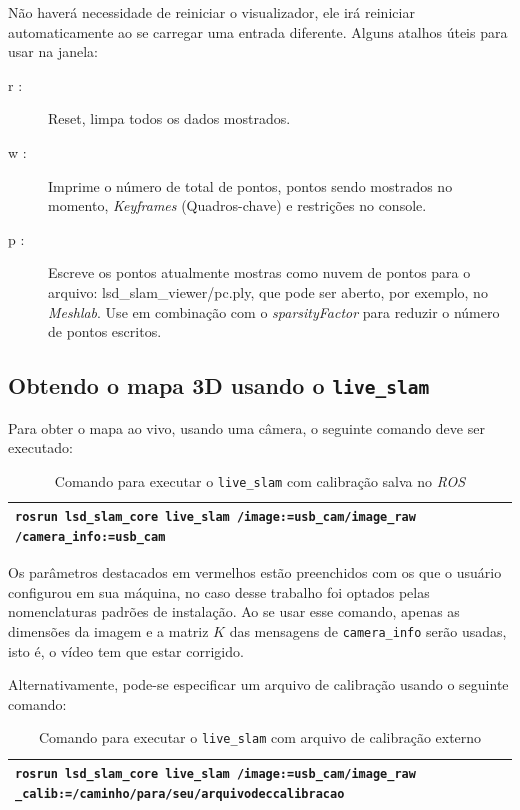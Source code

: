 Não haverá necessidade de reiniciar o visualizador, ele irá reiniciar automaticamente ao se carregar uma entrada diferente. Alguns atalhos úteis para usar na janela:

\begin{description}
	\item[r :]{Reset, limpa todos os dados mostrados.}
	\item[w :]{Imprime o número de total de pontos, pontos sendo mostrados no momento, \textit{Keyframes} (Quadros-chave) e restrições no console.}
	\item[p :]{Escreve os pontos atualmente mostras como nuvem de pontos para o arquivo: lsd\_slam\_viewer/pc.ply, que pode ser aberto, por exemplo, no \textit{Meshlab}. Use  em combinação com o \textit{sparsityFactor}  para reduzir o número de pontos escritos.}
\end{description}	

\subsection{Obtendo o mapa 3D usando o \texttt{live\_slam}}

Para obter o mapa ao vivo, usando uma câmera, o seguinte comando deve ser executado:

\begin{table}[!ht]\label{tb:14}
\begin{tabular}{| p{\textwidth}|}
\hline
\texttt{rosrun lsd\_slam\_core live\_slam /image:=usb\_cam/image\_raw /camera\_info:=usb\_cam}\\
\hline
\end{tabular}
\caption{Comando para executar o \texttt{live\_slam} com calibração salva no \textit{ROS}}
\end{table}

Os parâmetros destacados em vermelhos estão preenchidos com os que o usuário configurou em sua máquina, no caso desse trabalho foi optados pelas nomenclaturas padrões de instalação. Ao se usar esse comando, apenas as dimensões da imagem e a matriz $K$ das mensagens de \texttt{camera\_info} serão usadas, isto é, o vídeo tem que estar corrigido.

Alternativamente, pode-se especificar um arquivo de calibração usando o seguinte comando:

\begin{table}[!ht]\label{tb:15}
\begin{tabular}{| p{\textwidth}|}
\hline
\texttt{rosrun lsd\_slam\_core live\_slam /image:=usb\_cam/image\_raw \_calib:=/caminho/para/seu/arquivodeccalibracao}\\
\hline
\end{tabular}
\caption{Comando para executar o \texttt{live\_slam} com arquivo de calibração externo}
\end{table}

